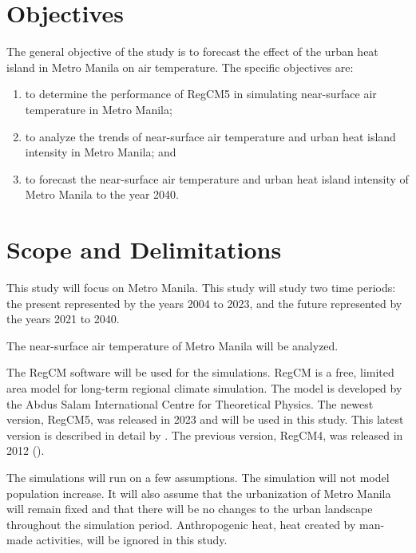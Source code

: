 \section{Objectives}
	The general objective of the study is to forecast the effect of the urban heat island in Metro Manila on air temperature.
	The specific objectives are:
	\begin{enumerate}
		\item to determine the performance of RegCM5 in simulating near-surface air temperature in Metro Manila;
		\item to analyze the trends of near-surface air temperature and urban heat island intensity in Metro Manila; and
		\item to forecast the near-surface air temperature and urban heat island intensity of Metro Manila to the year 2040.
		
	\end{enumerate}
	

\section{Scope and Delimitations}
	This study will focus on Metro Manila.
	This study will study two time periods: 
		the present represented by the years 2004 to 2023, 
		and the future represented by the years 2021 to 2040.
	
	The near-surface air temperature of Metro Manila will be analyzed.
	
	The RegCM software will be used for the simulations.
	RegCM is a free, limited area model for long-term regional climate simulation.
	The model is developed by the Abdus Salam International Centre for Theoretical Physics.
	The newest version, RegCM5, was released in 2023 and will be used in this study.
	This latest version is described in detail by \textcite{Giorgi2023}. 
	The previous version, RegCM4, was released in 2012 (\textcite{Giorgi2012}).
	
	The simulations will run on a few assumptions.
	The simulation will not model population increase.
	It will also assume that the urbanization of Metro Manila will remain fixed and that there will be no changes to the urban landscape throughout the simulation period.
	Anthropogenic heat, heat created by man-made activities, will be ignored in this study.